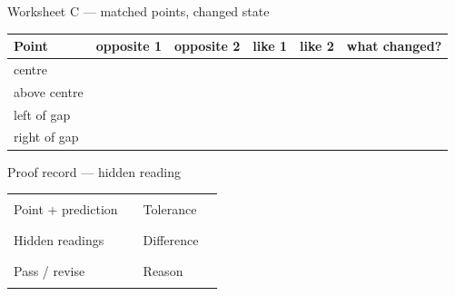 \begin{teloscard}{Worksheet C --- matched points, changed state}
\footnotesize
\begin{tabularx}{\linewidth}{@{}p{.17\linewidth}c c c c L@{}}
\toprule
Point & opposite 1 & opposite 2 & like 1 & like 2 & what changed?\\
\midrule
centre & & & & &\\[1.2em]
above centre & & & & &\\[1.2em]
left of gap & & & & &\\[1.2em]
right of gap & & & & &\\
\bottomrule
\end{tabularx}
\end{teloscard}

\begin{teloscard}{Proof record --- hidden reading}
\footnotesize
\begin{tabularx}{\linewidth}{@{}p{.17\linewidth}Xp{.18\linewidth}X@{}}
Point + prediction & \rule{\linewidth}{.3pt} &
Tolerance & \rule{\linewidth}{.3pt}\\[1.25em]
Hidden readings & \rule{\linewidth}{.3pt} &
Difference & \rule{\linewidth}{.3pt}\\[1.25em]
Pass / revise & \rule{\linewidth}{.3pt} &
Reason & \rule{\linewidth}{.3pt}
\end{tabularx}
\end{teloscard}

